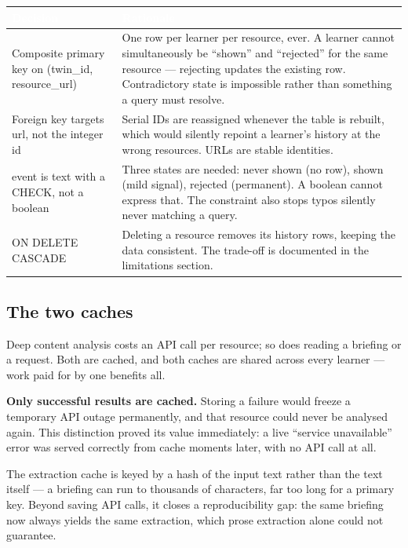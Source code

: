 \documentclass[11pt,a4paper]{article}
\newcommand{\thead}[1]{\textcolor{white}{\bfseries\small #1}}
\newcommand{\headrow}{\rowcolor{navy}}
\begin{document}
\vspace{4pt}
\begin{tabularx}{\textwidth}{>{\raggedright\arraybackslash}p{5cm} >{\raggedright\arraybackslash}X}
\headrow \thead{Decision} & \thead{Rationale} \\
\midrule
Composite primary key on (twin\_id, resource\_url) & One row per learner per resource, ever. A learner cannot simultaneously be ``shown'' and ``rejected'' for the same resource --- rejecting updates the existing row. Contradictory state is impossible rather than something a query must resolve. \\
\rowcolor{altshade} Foreign key targets url, not the integer id & Serial IDs are reassigned whenever the table is rebuilt, which would silently repoint a learner's history at the wrong resources. URLs are stable identities. \\
event is text with a CHECK, not a boolean & Three states are needed: never shown (no row), shown (mild signal), rejected (permanent). A boolean cannot express that. The constraint also stops typos silently never matching a query. \\
\rowcolor{altshade} ON DELETE CASCADE & Deleting a resource removes its history rows, keeping the data consistent. The trade-off is documented in the limitations section. \\
\bottomrule
\end{tabularx}
\vspace{8pt}

\subsection{The two caches}

Deep content analysis costs an API call per resource; so does reading a
briefing or a request. Both are cached, and both caches are shared across
every learner --- work paid for by one benefits all.

\textbf{Only successful results are cached.} Storing a failure would freeze a
temporary API outage permanently, and that resource could never be analysed
again. This distinction proved its value immediately: a live ``service
unavailable'' error was served correctly from cache moments later, with no API
call at all.

The extraction cache is keyed by a hash of the input text rather than the text
itself --- a briefing can run to thousands of characters, far too long for a
primary key. Beyond saving API calls, it closes a reproducibility gap: the
same briefing now always yields the same extraction, which prose extraction
alone could not guarantee.
\end{document}
